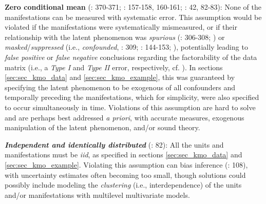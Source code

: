 \documentclass[
  10pt,
  a4paper,
  twoside]{article}
\begin{document}
\textbf{Zero conditional mean} (: 370-371; : 157-158, 160-161; : 42, 82-83): None of the manifestations can be measured with systematic error. This assumption would be violated if the manifestations were systematically mismeasured, or if their relationship with the latent phenomenon was \emph{spurious} (: 306-308; ) or \emph{masked}/\emph{suppressed} (i.e., \emph{confounded}, : 309; : 144-153; ), potentially leading to \emph{false positive} or \emph{false negative} conclusions regarding the factorability of the data matrix (i.e., a \emph{Type I} and \emph{Type II} error, respectively, cf. ). In sections \ref{sec:sec_kmo_data} and \ref{sec:sec_kmo_example}, this was guaranteed by specifying the latent phenomenon to be exogenous of all confounders and temporally preceding the manifestations, which for simplicity, were also specified to occur simultaneously in time. Violations of this assumption are hard to solve and are perhaps best addressed \emph{a priori}, with accurate measures, exogenous manipulation of the latent phenomenon, and/or sound theory.

\textbf{\emph{Independent and identically distributed}} (: 82): All the units and manifestations must be \emph{iid}, as specified in sections \ref{sec:sec_kmo_data} and \ref{sec:sec_kmo_example}. Violating this assumption can bias inference (: 108), with uncertainty estimates often becoming too small, though solutions could possibly include modeling the \emph{clustering} (i.e., interdependence) of the units and/or manifestations with multilevel multivariate models.
\end{document}
